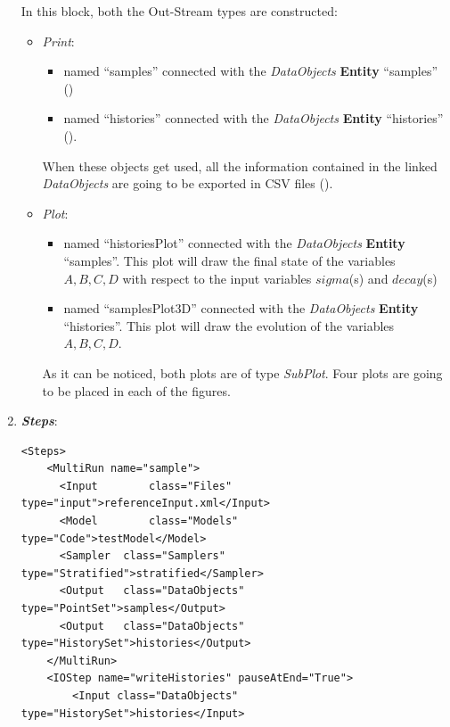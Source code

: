 \begin{enumerate}
\begin{figure}[h!]
  \label{fig:historiesStratifiedPlotLine}
 \end{figure}
  In this block, both the Out-Stream types are constructed: 
  \begin{itemize}
    \item \textit{Print}: 
     \begin{itemize}
       \item named ``samples'' connected with the \textit{DataObjects} \textbf{Entity} ``samples'' 
                ()
       \item named ``histories'' connected with the \textit{DataObjects} \textbf{Entity} ``histories'' ().
     \end{itemize}         
      When these objects get used, all the information contained in the 
      linked  \textit{DataObjects} are going 
    to be exported in CSV files ().
    \item \textit{Plot}: 
    \begin{itemize}
      \item named ``historiesPlot'' connected with the  \textit{DataObjects} 
      \textbf{Entity} ``samples''.  This plot will draw the final state of the
      variables $A,B,C,D$ with respect to the input variables $sigma$(s) 
      and $decay$(s)
      \item named ``samplesPlot3D'' connected with the  
      \textit{DataObjects} \textbf{Entity} ``histories''. This plot will draw the 
      evolution of the variables $A,B,C,D$.
    \end{itemize}
     As it can be noticed, both plots are of type \textit{SubPlot}. Four plots
     are going to be placed in each of the figures.
  \end{itemize}   
   \item \textbf{\textit{Steps}}:   
\begin{lstlisting}[style=XML,morekeywords={arg,extension,pauseAtEnd,overwrite}]
  <Steps>
    <MultiRun name="sample">
      <Input 	    class="Files" 			 type="input">referenceInput.xml</Input>
      <Model 	    class="Models" 		 type="Code">testModel</Model>
      <Sampler 	class="Samplers" 		 type="Stratified">stratified</Sampler>
      <Output 	class="DataObjects"  type="PointSet">samples</Output>
      <Output 	class="DataObjects"  type="HistorySet">histories</Output>
    </MultiRun>
    <IOStep name="writeHistories" pauseAtEnd="True">
        <Input class="DataObjects" type="HistorySet">histories</Input>

\end{lstlisting}
\end{enumerate}
